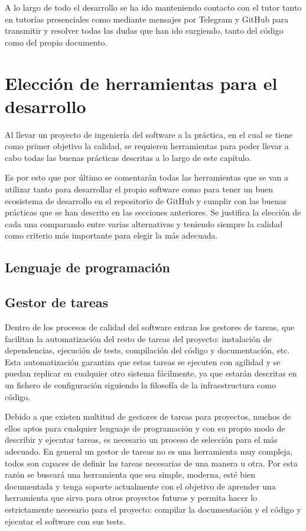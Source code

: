 A lo largo de todo el desarrollo se ha ido manteniendo contacto con el tutor
tanto en tutorías presenciales como mediante mensajes por Telegram y GitHub para
transmitir y resolver todas las dudas que han ido surgiendo, tanto del código
como del propio documento.

\section{Elección de herramientas para el desarrollo}
Al llevar un proyecto de ingeniería del software a la práctica, en el cual se
tiene como primer objetivo la calidad, se requieren herramientas para poder
llevar a cabo todas las buenas prácticas descritas a lo largo de este capítulo. 

Es por esto que por último se comentarán todas las herramientas que se van a
utilizar tanto para desarrollar el propio software como para tener un buen
ecosistema de desarrollo en el repositorio de GitHub y cumplir con las buenas
prácticas que se han descrito en las secciones anteriores. Se justifica la
elección de cada una comparando entre varias alternativas y teniendo siempre la
calidad como criterio más importante para elegir la más adecuada.

\subsection{Lenguaje de programación}

\subsection{Gestor de tareas}
Dentro de los procesos de calidad del software entran los gestores de tareas,
que facilitan la automatización del resto de tareas del proyecto: instalación de
dependencias, ejecución de tests, compilación del código y documentación, etc.
Esta automatización garantiza que estas tareas se ejecuten con agilidad y se
puedan replicar en cualquier otro sistema fácilmente, ya que estarán descritas
en un fichero de configuración siguiendo la filosofía de la infraestructura como
código.

Debido a que existen multitud de gestores de tareas para proyectos, muchos de
ellos aptos para cualquier lenguaje de programación y con su propio modo de
describir y ejecutar tareas, es necesario un proceso de selección para el más
adecuado. En general un gestor de tareas no es una herramienta muy compleja,
todos son capaces de definir las tareas necesarias de una manera u otra. Por
esta razón se buscará una herramienta que sea simple, moderna, esté bien
documentada y tenga soporte actualmente con el objetivo de aprender una
herramienta que sirva para otros proyectos futuros y permita hacer lo
estrictamente necesario para el proyecto: compilar la documentación y el código
y ejecutar el software con sus tests. 

